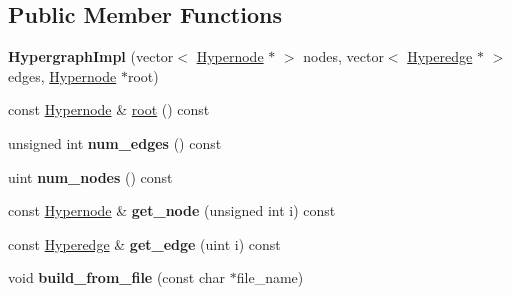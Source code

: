 \subsection*{Public Member Functions}
\begin{DoxyCompactItemize}
\item 
\hypertarget{classScarab_1_1HG_1_1HypergraphImpl_a935bed9b8cf9235a1adb61d0889f6ac7}{
{\bfseries HypergraphImpl} (vector$<$ \hyperlink{classScarab_1_1HG_1_1Hypernode}{Hypernode} $\ast$ $>$ nodes, vector$<$ \hyperlink{classScarab_1_1HG_1_1Hyperedge}{Hyperedge} $\ast$ $>$ edges, \hyperlink{classScarab_1_1HG_1_1Hypernode}{Hypernode} $\ast$root)}
\label{classScarab_1_1HG_1_1HypergraphImpl_a935bed9b8cf9235a1adb61d0889f6ac7}

\item 
const \hyperlink{classScarab_1_1HG_1_1Hypernode}{Hypernode} \& \hyperlink{classScarab_1_1HG_1_1HypergraphImpl_a31172009b97d179f6b1199f191197a32}{root} () const 
\item 
\hypertarget{classScarab_1_1HG_1_1HypergraphImpl_a0adcc8783b94cbe07b092220082d00ab}{
unsigned int {\bfseries num\_\-edges} () const }
\label{classScarab_1_1HG_1_1HypergraphImpl_a0adcc8783b94cbe07b092220082d00ab}

\item 
\hypertarget{classScarab_1_1HG_1_1HypergraphImpl_ad39e917a84acb1d4caf0145ce8a903a2}{
uint {\bfseries num\_\-nodes} () const }
\label{classScarab_1_1HG_1_1HypergraphImpl_ad39e917a84acb1d4caf0145ce8a903a2}

\item 
\hypertarget{classScarab_1_1HG_1_1HypergraphImpl_a9276a6faa074eb4f3bbb2f8b8d5d4fbf}{
const \hyperlink{classScarab_1_1HG_1_1Hypernode}{Hypernode} \& {\bfseries get\_\-node} (unsigned int i) const }
\label{classScarab_1_1HG_1_1HypergraphImpl_a9276a6faa074eb4f3bbb2f8b8d5d4fbf}

\item 
\hypertarget{classScarab_1_1HG_1_1HypergraphImpl_a31a148139b888b6bd10e78fe555144c7}{
const \hyperlink{classScarab_1_1HG_1_1Hyperedge}{Hyperedge} \& {\bfseries get\_\-edge} (uint i) const }
\label{classScarab_1_1HG_1_1HypergraphImpl_a31a148139b888b6bd10e78fe555144c7}

\item 
\hypertarget{classScarab_1_1HG_1_1HypergraphImpl_a1f33418f90b826db9cfc0bb34e1ca9cf}{
void {\bfseries build\_\-from\_\-file} (const char $\ast$file\_\-name)}
\label{classScarab_1_1HG_1_1HypergraphImpl_a1f33418f90b826db9cfc0bb34e1ca9cf}


\end{DoxyCompactItemize}

